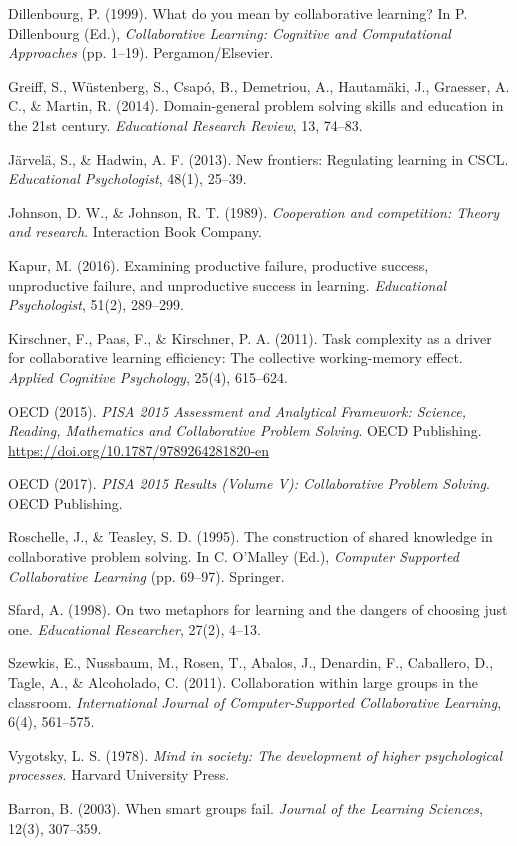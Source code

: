 \documentclass[
  11pt,
]{article}
\begin{document}
Dillenbourg, P. (1999). What do you mean by collaborative learning? In P. Dillenbourg (Ed.), \emph{Collaborative Learning: Cognitive and Computational Approaches} (pp. 1--19). Pergamon/Elsevier.

Greiff, S., Wüstenberg, S., Csapó, B., Demetriou, A., Hautamäki, J., Graesser, A. C., \& Martin, R. (2014). Domain-general problem solving skills and education in the 21st century. \emph{Educational Research Review}, 13, 74--83.

Järvelä, S., \& Hadwin, A. F. (2013). New frontiers: Regulating learning in CSCL. \emph{Educational Psychologist}, 48(1), 25--39.

Johnson, D. W., \& Johnson, R. T. (1989). \emph{Cooperation and competition: Theory and research}. Interaction Book Company.

Kapur, M. (2016). Examining productive failure, productive success, unproductive failure, and unproductive success in learning. \emph{Educational Psychologist}, 51(2), 289--299.

Kirschner, F., Paas, F., \& Kirschner, P. A. (2011). Task complexity as a driver for collaborative learning efficiency: The collective working-memory effect. \emph{Applied Cognitive Psychology}, 25(4), 615--624.

OECD (2015). \emph{PISA 2015 Assessment and Analytical Framework: Science, Reading, Mathematics and Collaborative Problem Solving}. OECD Publishing. \url{https://doi.org/10.1787/9789264281820-en}

OECD (2017). \emph{PISA 2015 Results (Volume V): Collaborative Problem Solving}. OECD Publishing.

Roschelle, J., \& Teasley, S. D. (1995). The construction of shared knowledge in collaborative problem solving. In C. O'Malley (Ed.), \emph{Computer Supported Collaborative Learning} (pp. 69--97). Springer.

Sfard, A. (1998). On two metaphors for learning and the dangers of choosing just one. \emph{Educational Researcher}, 27(2), 4--13.

Szewkis, E., Nussbaum, M., Rosen, T., Abalos, J., Denardin, F., Caballero, D., Tagle, A., \& Alcoholado, C. (2011). Collaboration within large groups in the classroom. \emph{International Journal of Computer-Supported Collaborative Learning}, 6(4), 561--575.

Vygotsky, L. S. (1978). \emph{Mind in society: The development of higher psychological processes}. Harvard University Press.

Barron, B. (2003). When smart groups fail. \emph{Journal of the Learning Sciences}, 12(3), 307--359.
\end{document}
